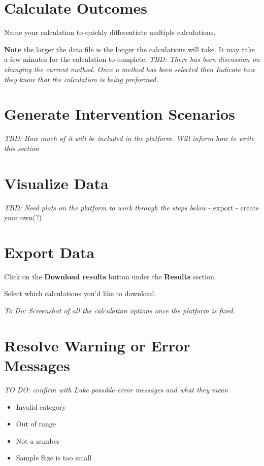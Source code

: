\documentclass[]{book}
\providecommand{\tightlist}{%
  \setlength{\itemsep}{0pt}\setlength{\parskip}{0pt}}
\begin{document}
\section{Calculate Outcomes}\label{calculate-outcomes}

Name your calculation to quickly differentiate multiple calculations.

\textbf{Note} the larger the data file is the longer the calculations
will take. It may take a few minutes for the calculation to complete.
\emph{TBD: There has been discussion on changing the current method.
Once a method has been selected then Indicate how they know that the
calculation is being preformed.}

\section{Generate Intervention
Scenarios}\label{generate-intervention-scenarios}

\emph{TBD: How much of it will be included in the platform. Will inform
how to write this section}

\section{Visualize Data}\label{visualize-data}

\emph{TBD: Need plots on the platform to work through the steps below} -
export - create your own(?)

\section{Export Data}\label{export-data}

Click on the \textbf{Download results} button under the \textbf{Results}
section.

Select which calculations you'd like to download.

\emph{To Do: Screenshot of all the calculation options once the platform
is fixed.}

\section{Resolve Warning or Error
Messages}\label{resolve-warning-or-error-messages}

\emph{TO DO: confirm with Luke possible error messages and what they
mean}

\begin{itemize}
\tightlist
\item
  Invalid category
\item
  Out of range
\item
  Not a number
\item
  Sample Size is too small
\end{itemize}
\end{document}
